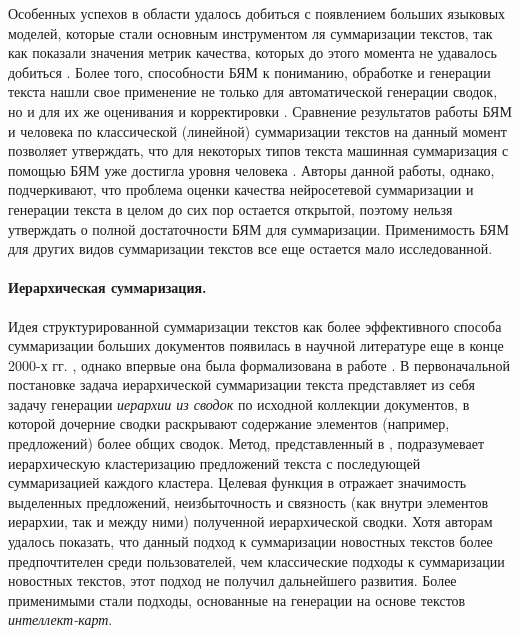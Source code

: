 \documentclass[12pt]{article}
\begin{document}
Особенных успехов в области удалось добиться с появлением больших языковых моделей, которые стали основным инструментом ля суммаризации текстов, так как показали значения метрик качества, которых до этого момента не удавалось добиться \cite{jin2024comprehensive}. Более того, способности БЯМ к пониманию, обработке и генерации текста нашли свое применение не только для автоматической генерации сводок, но и для их же оценивания и корректировки \cite{wu2023large}. Сравнение результатов работы БЯМ и человека по классической (линейной) суммаризации текстов на данный момент позволяет утверждать, что для некоторых типов текста машинная суммаризация с помощью БЯМ уже достигла уровня человека \cite{pu2023summarization}. Авторы данной работы, однако, подчеркивают, что проблема оценки качества нейросетевой суммаризации и генерации текста в целом до сих пор остается открытой, поэтому нельзя утверждать о полной достаточности БЯМ для суммаризации. Применимость БЯМ для других видов суммаризации текстов все еще остается мало исследованной.

\paragraph{Иерархическая суммаризация.} Идея структурированной суммаризации текстов как более эффективного способа суммаризации больших документов появилась в научной литературе еще в конце 2000-х гг. \cite{yang2008hierarchical}, однако впервые она была формализована в работе \cite{christensen2014hierarchical}. В первоначальной постановке задача иерархической суммаризации текста представляет из себя задачу генерации \textit{иерархии из сводок} по исходной коллекции документов, в которой дочерние сводки раскрывают содержание элементов (например, предложений) более общих сводок. Метод, представленный в \cite{christensen2014hierarchical}, подразумевает иерархическую кластеризацию предложений текста с последующей суммаризацией каждого кластера. Целевая функция в \cite{christensen2014hierarchical} отражает значимость выделенных предложений, неизбыточность и связность (как внутри элементов иерархии, так и между ними) полученной иерархической сводки. Хотя авторам удалось показать, что данный подход к суммаризации новостных текстов более предпочтителен среди пользователей, чем классические подходы к суммаризации новостных текстов, этот подход не получил дальнейшего развития. Более применимыми стали подходы, основанные на генерации на основе текстов \textit{интеллект-карт}.
\end{document}
